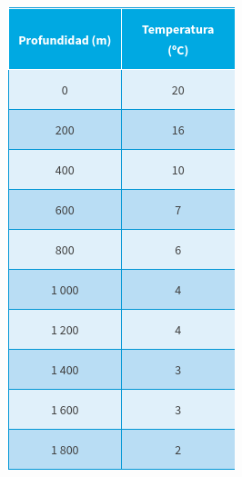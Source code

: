 \documentclass[11pt]{book}
\begin{document}
\begin{enumerate}
\begin{minipage}[t]{0.35\linewidth}
\begin{figure}[H]
            \includegraphics[width=\linewidth]{table_bati.jpg}
            \label{tab:table_bati}
          \end{figure}%

\end{minipage}
\end{enumerate}
\end{document}
